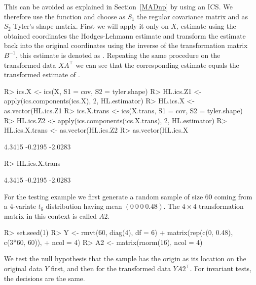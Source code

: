 \documentclass[article,nojss]{jss}
\begin{document}
This can be avoided as explained in Section~\ref{MADnp} by using an ICS. We therefore use the function 
and choose as $S_1$ the regular covariance matrix and as $S_2$ Tyler's shape matrix. First we will apply it only on $X$, estimate using the obtained
coordinates the Hodges-Lehmann estimate and transform
the estimate back into the original coordinates using the inverse of the transformation matrix $B^{-1}$, this estimate is denoted as .
Repeating the same procedure on the transformed data $XA^\top$ we can see that the corresponding estimate 
equals the transformed estimate of .

\begin{Schunk}
\begin{Sinput}
R> ics.X <- ics(X, S1 = cov, S2 = tyler.shape)
R> HL.ics.Z1 <- apply(ics.components(ics.X), 2, HL.estimator)
R> HL.ics.X <- as.vector(HL.ics.Z1 %
R> ics.X.trans <- ics(X.trans, S1 = cov, S2 = tyler.shape)
R> HL.ics.Z2 <- apply(ics.components(ics.X.trans), 2, HL.estimator)
R> HL.ics.X.trans <- as.vector(HL.ics.Z2 %
R> as.vector(HL.ics.X %
\end{Sinput}
\begin{Soutput}
[1]  4.3415 -0.2195 -2.0283
\end{Soutput}
\begin{Sinput}
R> HL.ics.X.trans
\end{Sinput}
\begin{Soutput}
[1]  4.3415 -0.2195 -2.0283
\end{Soutput}
\end{Schunk}
For the testing example we first generate a random sample of size 60 coming from a 4-variate $t_6$ distribution having mean $(0 \ 0 \ 0 \ 0.48)$.
The $4 \times 4$ transformation matrix in this context is called $A2$.
\begin{Schunk}
\begin{Sinput}
R> set.seed(1)
R> Y <- rmvt(60, diag(4), df = 6) + matrix(rep(c(0, 0.48), c(3*60, 60)),
+    ncol = 4)
R> A2 <- matrix(rnorm(16), ncol = 4)
\end{Sinput}
\end{Schunk}
We test the null hypothesis that the sample has the origin as its location on the original data $Y$ first, and then
for the transformed data $YA2^\top$. For invariant tests, the decisions are the same.
\end{document}
